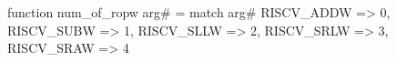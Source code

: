 function num_of_ropw arg# = match arg# {
  RISCV_ADDW => 0,
  RISCV_SUBW => 1,
  RISCV_SLLW => 2,
  RISCV_SRLW => 3,
  RISCV_SRAW => 4
}
